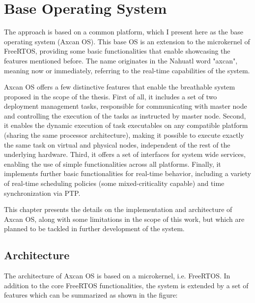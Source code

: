 
\chapter{Base Operating System}\label{chap:os}

The approach is based on a common platform, which I present here as the base operating system (Axcan OS). This base OS is an extension to the microkernel of FreeRTOS, providing some basic functionalities that enable showcasing the features mentioned before. The name originates in the Nahuatl word "axcan", meaning now or immediately, referring to the real-time capabilities of the system.

Axcan OS offers a few distinctive features that enable the breathable system proposed in the scope of the thesis. First of all, it includes a set of two deployment management tasks, responsible for communicating with master node and controlling the execution of the tasks as instructed by master node. Second, it enables the dynamic execution of task executables on any compatible platform (sharing the same processor architecture), making it possible to execute exactly the same task on virtual and physical nodes, independent of the rest of the underlying hardware. Third, it offers a set of interfaces for system wide services, enabling the use of simple functionalities across all platforms. Finally, it implements further basic functionalities for real-time behavior, including a variety of real-time scheduling policies (some mixed-criticality capable) and time synchronization via PTP.

This chapter presents the details on the implementation and architecture of Axcan OS, along with some limitations in the scope of this work, but which are planned to be tackled in further development of the system.

\section{Architecture}
The architecture of Axcan OS is based on a microkernel, i.e. FreeRTOS. In addition to the core FreeRTOS functionalities, the system is extended by a set of features which can be summarized as shown in the figure:

